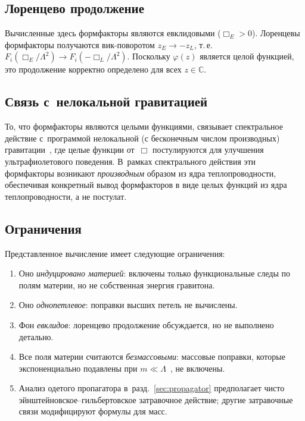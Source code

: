 \documentclass[aps,prd,twocolumn,superscriptaddress,nofootinbib,floatfix]{revtex4-2}
\theoremstyle{definition}
\theoremstyle{remark}
\begin{document}
\subsection{Лоренцево продолжение}

Вычисленные здесь формфакторы являются евклидовыми ($\Box_E > 0$).
Лоренцевы формфакторы получаются вик-поворотом $z_E \to -z_L$, т.\,е.\
$F_i(\Box_E/\Lambda^2) \to F_i(-\Box_L/\Lambda^2)$. Поскольку $\varphi(z)$
является целой функцией, это продолжение корректно определено для
всех $z \in \mathbb{C}$.

\subsection{Связь с~нелокальной гравитацией}

То, что формфакторы являются целыми функциями, связывает спектральное действие
с~программой нелокальной (с бесконечным числом производных)
гравитации~\cite{Modesto:2011kw,Tomboulis:1997gg,Biswas:2011ar}, где целые
функции от~$\Box$ постулируются для улучшения ультрафиолетового поведения.
В~рамках спектрального действия эти формфакторы возникают
\emph{производным} образом из ядра теплопроводности, обеспечивая конкретный
вывод формфакторов в виде целых функций из ядра теплопроводности, а не постулат.

\subsection{Ограничения}

Представленное вычисление имеет следующие ограничения:
\begin{enumerate}
\item Оно \emph{индуцировано материей}: включены только функциональные
  следы по полям материи, но не собственная энергия гравитона.
\item Оно \emph{однопетлевое}: поправки высших петель не вычислены.
\item Фон \emph{евклидов}: лоренцево продолжение обсуждается, но не
  выполнено детально.
\item Все поля материи считаются \emph{безмассовыми}: массовые поправки,
  которые экспоненциально подавлены при
  $m \ll \Lambda$~\cite{Gorbar:2002pw,Ribeiro:2018pyo}, не включены.
\item Анализ одетого пропагатора в~разд.~\ref{sec:propagator}
  предполагает чисто эйнштейновское--гильбертовское затравочное действие;
  другие затравочные связи модифицируют формулы для масс.
\end{enumerate}
\end{document}

